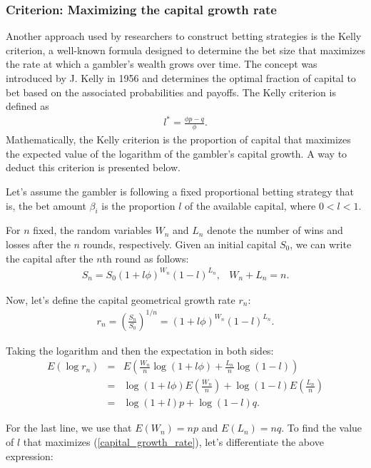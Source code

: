 \documentclass[11pt,twoside]{article}
\numberwithin{Theorem}{section}
\numberwithin{Definition}{section}
\numberwithin{Lemma}{section}
\numberwithin{Algorithm}{section}
\numberwithin{equation}{section}
\begin{document}
\subsubsection{Criterion: Maximizing the capital growth rate}
Another approach used by researchers to construct betting strategies is the Kelly criterion, a well-known formula designed to determine the bet size that maximizes the rate at which a gambler's wealth grows over time. The concept was introduced by J. Kelly in 1956\cite{Kelly} and determines the optimal fraction of capital to bet based on the associated probabilities and payoffs. The Kelly criterion is defined as 
\begin{eqnarray}\label{kelly_crit}
    l^{*} = \frac{\phi p-q}{\phi}.
\end{eqnarray}
Mathematically, the Kelly criterion is the proportion of capital that maximizes the expected value of the logarithm of the gambler's capital growth. A way to deduct this criterion is presented below.

Let's assume the gambler is following a fixed proportional betting strategy that is, the bet amount $\beta_{i}$ 
is the proportion $l$ of the available capital, where $0<l<1$.

For $n$ fixed, the random variables $W_{n}$ and $L_{n}$ denote the number of wins and losses after the $n$ rounds, respectively. Given an initial capital $S_{0}$, we can write the capital after the $n$th round as follows:
\begin{eqnarray*}
    S_{n} = S_{0}(1+l\phi)^{W_{n}}(1-l)^{L_{n}}, & W_{n}+L_{n} = n.
\end{eqnarray*}

Now, let's define the capital geometrical growth rate $r_{n}$:
\begin{eqnarray}\label{capital_growth_rate}
    r_{n}= \left(\frac{S_{n}}{S_{0}}\right)^{1/n} = (1+l\phi)^{W_{n}}(1-l)^{L_{n}}.
\end{eqnarray}

Taking the logarithm and then the expectation in both sides:
\begin{eqnarray*}
E(\log r_{n}) &= &E\left(\frac{W_{n}}{n}\log(1+l\phi)+ \frac{L_{n}}{n}\log(1-l)\right)\\
& = & \log(1+l\phi) E\left(\frac{W_{n}}{n}\right)+ \log(1-l)E\left(\frac{L_{n}}{n}\right)\\
& = & \log (1+l) p + \log(1-l)q.
\end{eqnarray*}

For the last line, we use that \(E(W_{n}) = np\) and \(E(L_{n}) = nq\). To find the value of \(l\) that maximizes (\ref{capital_growth_rate}), let's differentiate the above expression:
\end{document}
